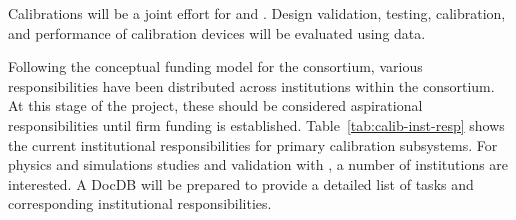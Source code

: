 


Calibrations %
will be a joint effort for \single and \dual. Design validation, testing, calibration, and performance of calibration devices will be evaluated using  data.

Following the conceptual funding model for the consortium, various responsibilities have been distributed across institutions within the consortium. At this stage of the project, these should be considered aspirational responsibilities until firm funding is established. Table~\ref{tab:calib-inst-resp} shows the current institutional responsibilities for primary calibration subsystems. 
For physics and simulations studies and validation with , a number of institutions are interested. A 
 DocDB will be prepared to provide a detailed list of tasks and corresponding institutional responsibilities.


\begin{comment}
\begin{dunetable}
[Institutional responsibility for calibrations]
{p{0.25\textwidth}p{0.65\textwidth}}
{tab:calib-inst-resp}
{Institutional responsibilities in the Calibration Consortium}   
System & Institutional Responsibility \\ \toprowrule
Laser System & Bern, Hawaii, LIP, Pitt, UTK \\ \colhline
Pulsed Neutron Source & BU, CSU, UC Davis, Iowa, LIP, MSU, SDSMT \\ 
\end{dunetable}
\end{comment}

